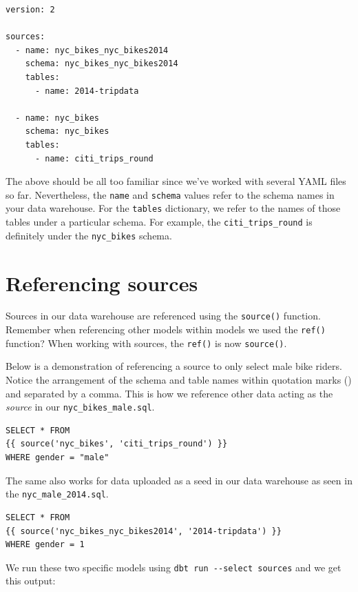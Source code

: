 \documentclass[
]{book}
\begin{document}
\begin{verbatim}
version: 2

sources:
  - name: nyc_bikes_nyc_bikes2014
    schema: nyc_bikes_nyc_bikes2014
    tables:
      - name: 2014-tripdata

  - name: nyc_bikes
    schema: nyc_bikes 
    tables:
      - name: citi_trips_round
\end{verbatim}

The above should be all too familiar since we've worked with several YAML files so far. Nevertheless, the \texttt{name} and \texttt{schema} values refer to the schema names in your data warehouse. For the \texttt{tables} dictionary, we refer to the names of those tables under a particular schema. For example, the \texttt{citi\_trips\_round} is definitely under the \texttt{nyc\_bikes} schema.

\hypertarget{referencing-sources}{%
\section{Referencing sources}\label{referencing-sources}}

Sources in our data warehouse are referenced using the \texttt{source()} function. Remember when referencing other models within models we used the \texttt{ref()} function? When working with sources, the \texttt{ref()} is now \texttt{source()}.

Below is a demonstration of referencing a source to only select male bike riders. Notice the arrangement of the schema and table names within quotation marks (\texttt{\textquotesingle{}\textquotesingle{}}) and separated by a comma. This is how we reference other data acting as the \emph{source} in our \texttt{nyc\_bikes\_male.sql}.

\begin{verbatim}
SELECT * FROM 
{{ source('nyc_bikes', 'citi_trips_round') }}
WHERE gender = "male"
\end{verbatim}

The same also works for data uploaded as a seed in our data warehouse as seen in the \texttt{nyc\_male\_2014.sql}.

\begin{verbatim}
SELECT * FROM 
{{ source('nyc_bikes_nyc_bikes2014', '2014-tripdata') }}
WHERE gender = 1
\end{verbatim}

We run these two specific models using \texttt{dbt\ run\ -\/-select\ sources} and we get this output:
\end{document}

